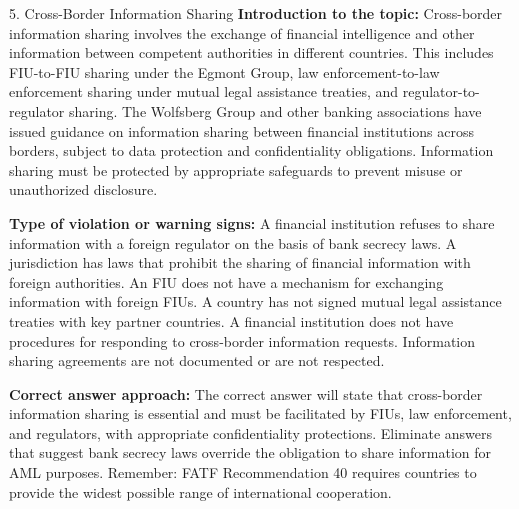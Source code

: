 \documentclass[11pt,a4paper]{beamer}
\begin{document}
\begin{frame}{5. Cross-Border Information Sharing}
\tiny
\noindent\textbf{Introduction to the topic:} Cross-border information sharing involves the exchange of financial intelligence and other information between competent authorities in different countries. This includes FIU-to-FIU sharing under the Egmont Group, law enforcement-to-law enforcement sharing under mutual legal assistance treaties, and regulator-to-regulator sharing. The Wolfsberg Group and other banking associations have issued guidance on information sharing between financial institutions across borders, subject to data protection and confidentiality obligations. Information sharing must be protected by appropriate safeguards to prevent misuse or unauthorized disclosure.

\vspace{0.1cm}
\noindent\textbf{Type of violation or warning signs:} A financial institution refuses to share information with a foreign regulator on the basis of bank secrecy laws. A jurisdiction has laws that prohibit the sharing of financial information with foreign authorities. An FIU does not have a mechanism for exchanging information with foreign FIUs. A country has not signed mutual legal assistance treaties with key partner countries. A financial institution does not have procedures for responding to cross-border information requests. Information sharing agreements are not documented or are not respected.

\vspace{0.1cm}
\noindent\textbf{Correct answer approach:} The correct answer will state that cross-border information sharing is essential and must be facilitated by FIUs, law enforcement, and regulators, with appropriate confidentiality protections. Eliminate answers that suggest bank secrecy laws override the obligation to share information for AML purposes. Remember: FATF Recommendation 40 requires countries to provide the widest possible range of international cooperation.
\end{frame}
\end{document}
